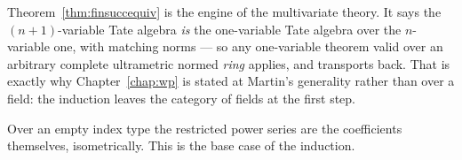Theorem~\ref{thm:finsuccequiv} is the engine of the multivariate theory.  It says the
$(n+1)$-variable Tate algebra \emph{is} the one-variable Tate algebra over the $n$-variable one,
with matching norms --- so any one-variable theorem valid over an arbitrary complete ultrametric
normed \emph{ring} applies, and transports back.  That is exactly why Chapter~\ref{chap:wp} is
stated at Martin's generality rather than over a field: the induction leaves the category of
fields at the first step.

\begin{lemma}
  \label{lem:isemptyequiv}
  \leanok
  Over an empty index type the restricted power series are the coefficients themselves,
  isometrically.  This is the base case of the induction.
\end{lemma}
